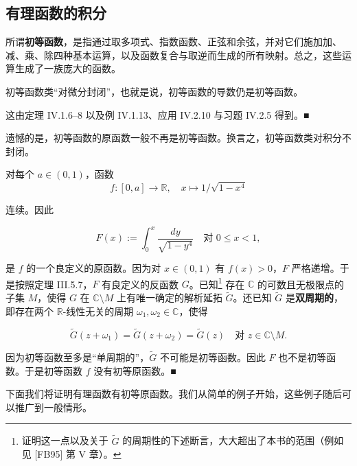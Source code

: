 \subsection*{有理函数的积分}

所谓\textbf{初等函数}，是指通过取多项式、指数函数、正弦和余弦，并对它们施加加、减、乘、除四种基本运算，以及函数复合与取逆而生成的所有映射。总之，这些运算生成了一族庞大的函数。

\begin{remark}

\begin{items}
\item

初等函数类“对微分封闭”，也就是说，初等函数的导数仍是初等函数。

\proofhead
这由定理 IV.1.6–8 以及例 IV.1.13、应用 IV.2.10 与习题 IV.2.5 得到。\nobreak\hspace{0.35em}■
\item

遗憾的是，初等函数的原函数一般不再是初等函数。换言之，初等函数类对积分不封闭。

\proofhead
对每个 $ a \in (0, 1) $，函数
\[
f : [0, a] \to \mathbb{R} , \quad x \mapsto 1/\sqrt{1 - x^4}
\]

连续。因此

\[
F(x) := \int_{0}^{x} \frac{dy}{\sqrt{1 - y^4}} \quad \text{对 } 0 \le x < 1 ,
\]

是 $ f $ 的一个良定义的原函数。因为对 $ x \in (0, 1) $ 有 $ f(x) > 0 $，$ F $ 严格递增。于是按照定理 III.5.7，$ F $ 有良定义的反函数 $ G $。已知\footnote{证明这一点以及关于 $ \widetilde{G} $ 的周期性的下述断言，大大超出了本书的范围（例如见 [FB95] 第 V 章）。} 存在 $ \mathbb{C} $ 的可数且无极限点的子集 $ M $，使得 $ G $ 在 $ \mathbb{C} \setminus M $ 上有唯一确定的解析延拓 $ \widetilde{G} $。还已知 $ \widetilde{G} $ 是\textbf{双周期的}，即存在两个 $ \mathbb{R} $-线性无关的周期 $ \omega_1, \omega_2 \in \mathbb{C} $，使得

\[
\widetilde{G}(z + \omega_1) = \widetilde{G}(z + \omega_2) = \widetilde{G}(z) \quad \text{对 } z \in \mathbb{C} \setminus M .
\]

因为初等函数至多是“单周期的”，$ \widetilde{G} $ 不可能是初等函数。因此 $ F $ 也不是初等函数。于是初等函数 $ f $ 没有初等原函数。\nobreak\hspace{0.35em}■

\end{items}

下面我们将证明有理函数有初等原函数。我们从简单的例子开始，这些例子随后可以推广到一般情形。

\end{remark}

